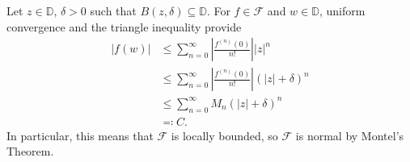 \documentclass[10pt]{mypackage}
\renewcommand{\D}{\mathbb{D}}
\begin{document}
\begin{solution}
  Let $z\in \D$, $\delta > 0$ such that $B\left( z,\delta \right)\subseteq \D$. For $f\in \mathcal{F}$ and $w\in \D$, uniform convergence and the triangle inequality provide
  \begin{align*}
    \left\vert f(w) \right\vert &\leq \sum_{n=0}^{\infty} \left\vert \frac{f^{(n)}(0)}{n!} \right\vert \left\vert z \right\vert^{n}\\
                                &\leq \sum_{n=0}^{\infty} \left\vert \frac{f^{(n)}(0)}{n!} \right\vert \left( \left\vert z \right\vert + \delta \right)^{n}\\
                                &\leq \sum_{n=0}^{\infty} M_n\left( \left\vert z \right\vert + \delta \right)^{n}\\
                                &\eqcolon C.
  \end{align*}
  In particular, this means that $\mathcal{F}$ is locally bounded, so $\mathcal{F}$ is normal by Montel's Theorem.
\end{solution}
\end{document}
